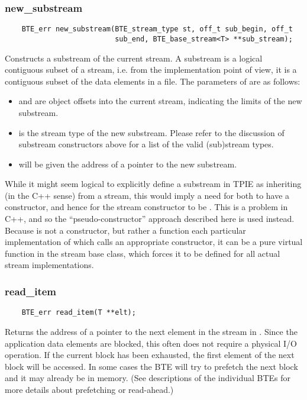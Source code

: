 \subsubsection{new\_substream}
\begin{verbatim}
    BTE_err new_substream(BTE_stream_type st, off_t sub_begin, off_t
                          sub_end, BTE_base_stream<T> **sub_stream);
\end{verbatim}

Constructs a substream of the current stream.  A substream
is a logical contiguous subset of a stream, i.e. from the
implementation point of view, it is a contiguous subset of
the data elements in a file.  The parameters of
 are as follows:
\begin{itemize}
    \item {} and  are
    object offsets into the current stream, indicating the
    limits of the new substream.
    
    \item {} is the stream type of the new
    substream. Please refer to the discussion of substream
    constructors above for a list of the valid (sub)stream
    types.

    \item {} will be given the address of
    a pointer to the new substream.
\end{itemize}

While it might seem logical to explicitly define a substream
in TPIE as inheriting (in the C++ sense) from a stream, this
would imply a need for both to have a constructor, and hence
for the stream constructor to be . This is a
problem in C++, and so the ``pseudo-constructor'' approach
described here is used instead.
Because  is not a constructor, but rather a
function each particular implementation of which calls an appropriate
constructor, it can be a pure virtual function in the stream base class,
which forces it to be defined for all actual stream
implementations.

\subsubsection{read\_item}
\begin{verbatim}
    BTE_err read_item(T **elt);
\end{verbatim}
Returns the address of a pointer to the next element in the
stream in . Since the application data elements are blocked,
this often does not require a physical I/O operation. If the
current block has been exhausted, the first element of the
next block will be accessed. In some cases the BTE will
try to prefetch the next block and it may already be in
memory. (See descriptions of the individual BTEs for more
details about prefetching or read-ahead.)

